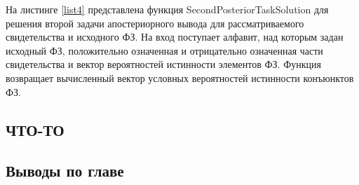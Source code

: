         На листинге \ref{list4} представлена функция SecondPosteriorTaskSolution для решения второй задачи апостериорного вывода для рассматриваемого свидетельства и исходного ФЗ. На вход поступает алфавит, над которым задан исходный ФЗ, положительно означенная и отрицательно означенная части свидетельства и вектор вероятностей истинности элементов ФЗ. Функция возвращает вычисленный вектор условных вероятностей истинности конъюнктов ФЗ.



\subsection{ЧТО-ТО}
\subsection{Выводы по главе}